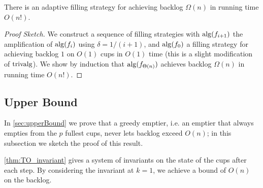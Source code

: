 \begin{theorem}
  There is an adaptive filling strategy for achieving backlog
  $\Omega(n)$ in running time $O(n!)$.
\end{theorem}
\begin{proof}[Proof Sketch]
We construct a sequence of filling strategies with $\operatorname{\text{\textup{alg}}}(f_{i+1})$ the
amplification of $\operatorname{\text{\textup{alg}}}(f_i)$ using $\delta = 1/(i+1)$, and
$\operatorname{\text{\textup{alg}}}(f_0)$ a filling strategy for achieving backlog $1$ on
$O(1)$ cups in $O(1)$ time (this is a slight modification of
$\operatorname{\text{\textup{trivalg}}}$). We show by induction that
$\operatorname{\text{\textup{alg}}}(f_{\Theta(n)})$ achieves backlog $\Omega(n)$ in running
time $O(n!)$.
\end{proof}

\subsection{Upper Bound}
In \cref{sec:upperBound} we prove that a greedy emptier, i.e. an
emptier that always empties from the $p$ fullest cups, never lets
backlog exceed $O(n)$; in this subsection we sketch the proof of
this result.

\cref{thm:TO_invariant} gives a system of invariants on the state of the
cups after each step. By considering the invariant at $k = 1$, we
achieve a bound of $O(n)$ on the backlog.

